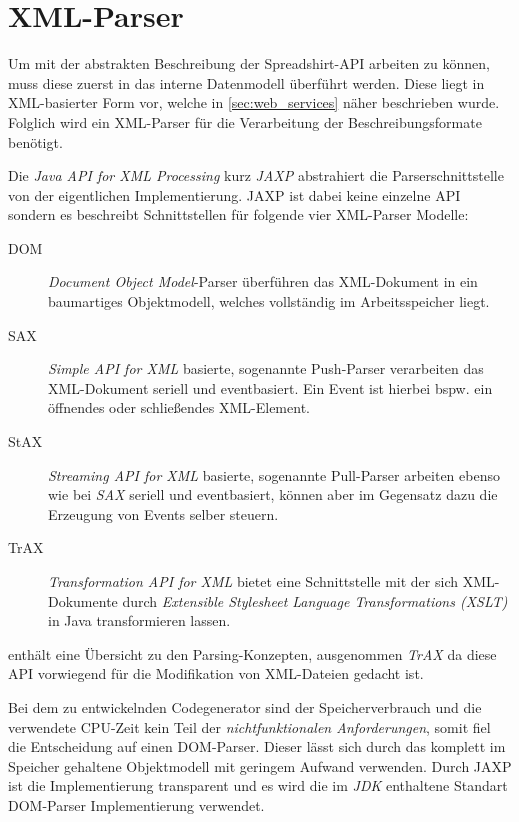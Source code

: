\section{XML-Parser}
\label{sec:xml_parser}

Um mit der abstrakten Beschreibung der Spreadshirt-API arbeiten zu können, muss diese zuerst in das interne Datenmodell überführt werden. Diese liegt in XML-basierter Form vor, welche in \cref{sec:web_services} näher beschrieben wurde. Folglich wird ein XML-Parser für die Verarbeitung der Beschreibungsformate benötigt.  

Die \emph{Java API for XML Processing} kurz \emph{JAXP} abstrahiert die Parserschnittstelle von der eigentlichen Implementierung. JAXP ist dabei keine einzelne API sondern es beschreibt Schnittstellen für folgende vier XML-Parser Modelle:

\begin{description}
    \item[DOM] \emph{Document Object Model}-Parser überführen das XML-Dokument in ein baumartiges Objektmodell, welches vollständig im Arbeitsspeicher liegt.
    \item[SAX] \emph{Simple API for XML} basierte, sogenannte Push-Parser verarbeiten das XML-Dokument seriell und eventbasiert. Ein Event ist hierbei bspw. ein öffnendes oder schließendes XML-Element.
    \item[StAX] \emph{Streaming API for XML} basierte, sogenannte Pull-Parser arbeiten ebenso wie bei \emph{SAX} seriell und eventbasiert, können aber im Gegensatz dazu die Erzeugung von Events selber steuern. 
    \item[TrAX] \emph{Transformation API for XML} bietet eine Schnittstelle mit der sich XML-Dokumente durch \emph{Extensible Stylesheet Language Transformations (XSLT)} in Java transformieren lassen.
\end{description}

 enthält eine Übersicht zu den Parsing-Konzepten, ausgenommen \emph{TrAX} da diese API vorwiegend für die Modifikation von XML-Dateien gedacht ist.

Bei dem zu entwickelnden Codegenerator sind der Speicherverbrauch und die verwendete CPU-Zeit kein Teil der \emph{nichtfunktionalen Anforderungen}, somit fiel die Entscheidung auf einen DOM-Parser. Dieser lässt sich durch das komplett im Speicher gehaltene Objektmodell mit geringem Aufwand verwenden. Durch JAXP ist die Implementierung transparent und es wird die im \emph{JDK} enthaltene Standart DOM-Parser Implementierung verwendet.

